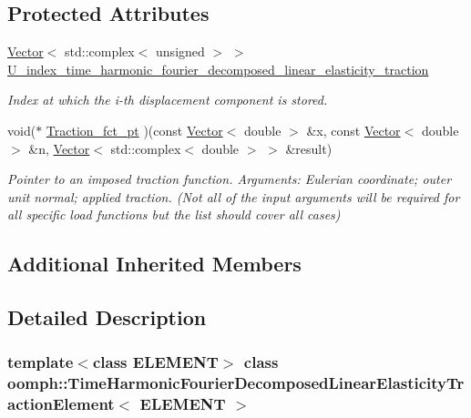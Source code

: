 \subsection*{Protected Attributes}
\begin{DoxyCompactItemize}
\item 
\hyperlink{classoomph_1_1Vector}{Vector}$<$ std\+::complex$<$ unsigned $>$ $>$ \hyperlink{classoomph_1_1TimeHarmonicFourierDecomposedLinearElasticityTractionElement_a99d3de6c501d6041662ac66cafa90af1}{U\+\_\+index\+\_\+time\+\_\+harmonic\+\_\+fourier\+\_\+decomposed\+\_\+linear\+\_\+elasticity\+\_\+traction}
\begin{DoxyCompactList}\small\item\em Index at which the i-\/th displacement component is stored. \end{DoxyCompactList}\item 
void($\ast$ \hyperlink{classoomph_1_1TimeHarmonicFourierDecomposedLinearElasticityTractionElement_ab1092987fb0e0180ed97b76d0a1910ac}{Traction\+\_\+fct\+\_\+pt} )(const \hyperlink{classoomph_1_1Vector}{Vector}$<$ double $>$ \&x, const \hyperlink{classoomph_1_1Vector}{Vector}$<$ double $>$ \&n, \hyperlink{classoomph_1_1Vector}{Vector}$<$ std\+::complex$<$ double $>$ $>$ \&result)
\begin{DoxyCompactList}\small\item\em Pointer to an imposed traction function. Arguments\+: Eulerian coordinate; outer unit normal; applied traction. (Not all of the input arguments will be required for all specific load functions but the list should cover all cases) \end{DoxyCompactList}\end{DoxyCompactItemize}
\subsection*{Additional Inherited Members}


\subsection{Detailed Description}
\subsubsection*{template$<$class E\+L\+E\+M\+E\+NT$>$\newline
class oomph\+::\+Time\+Harmonic\+Fourier\+Decomposed\+Linear\+Elasticity\+Traction\+Element$<$ E\+L\+E\+M\+E\+N\+T $>$}

